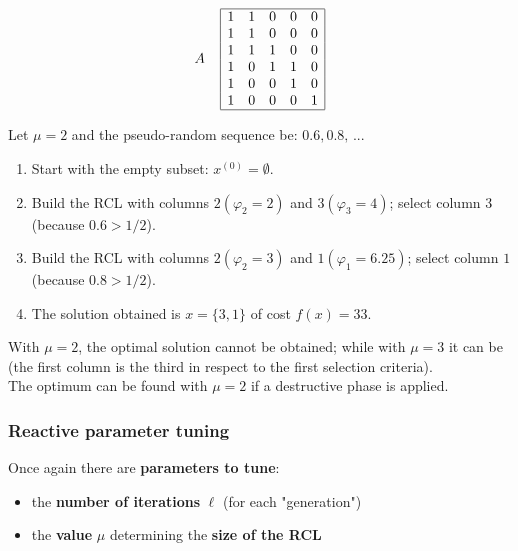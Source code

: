 \documentclass[11pt]{article}
\begin{document}
	$$
	A \;\;\;\;
	\begin{array}{| c c c c c |}
		\hline
		1 & 1 & 0 & 0 & 0 \\
		1 & 1 & 0 & 0 & 0 \\
		1 & 1 & 1 & 0 & 0 \\
		1 & 0 & 1 & 1 & 0 \\
		1 & 0 & 0 & 1 & 0 \\
		1 & 0 & 0 & 0 & 1 \\
		\hline
	\end{array}
	$$
	
	Let $\mu = 2$ and the pseudo-random sequence be: $0.6, 0.8, \, ...$
	\begin{enumerate}
		\item Start with the empty subset: $x^{(0)} = \emptyset$.\\
		
		\item Build the RCL with columns $2 (\varphi_2 = 2)$ and $3 (\varphi_3 = 4)$; select column $3$ (because $0.6 > 1/2$).\\
		
		\item Build the RCL with columns $2 (\varphi_2 = 3)$ and $1 (\varphi_1 = 6.25)$; select column $1$ (because $0.8 > 1/2$).\\
		
		\item The solution obtained is $x = \{3, 1\}$ of cost $f (x) = 33$.\\
	\end{enumerate}

	With $\mu = 2$, the optimal solution cannot be obtained; while with $\mu = 3$ it can be (the first column is the third in respect to the first selection criteria).\\
	
	The optimum can be found with $\mu = 2$ if a destructive phase is applied.\\
	
	\newpage
	
	\subsubsection{Reactive parameter tuning}
	
	Once again there are \textbf{parameters to tune}:
	\begin{itemize}
		\item the \textbf{number of iterations} $\ell$ (for each "generation")
		\item the \textbf{value} $\mu$ determining the \textbf{size of the RCL}
	\end{itemize}
	
\end{document}
